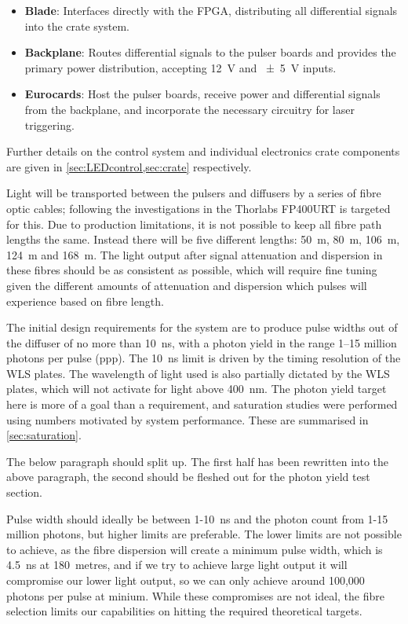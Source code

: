 \documentclass[a4paper,11pt]{article}
\begin{document}
\begin{itemize}
\item \textbf{Blade}: Interfaces directly with the FPGA, distributing all differential signals into the crate system.
\item \textbf{Backplane}: Routes differential signals to the pulser boards and provides the primary power distribution, accepting \SI{12}{\volt} and \SI{\pm5}{\volt} inputs.
\item \textbf{Eurocards}: Host the pulser boards, receive power and differential signals from the backplane, and incorporate the necessary circuitry for laser triggering.
\end{itemize}
Further details on the control system and individual electronics crate components are given in \cref{sec:LEDcontrol,sec:crate} respectively.

Light will be transported between the pulsers and diffusers by a series of fibre optic cables; following the investigations in \cite{TN91} the Thorlabs FP400URT \cite{FP400URT} is targeted for this. Due to production limitations, it is not possible to keep all fibre path lengths the same. Instead there will be five different lengths: 50~m, 80~m, 106~m, 124~m and 168~m. The light output after signal attenuation and dispersion in these fibres should be as consistent as possible, which will require fine tuning given the different amounts of attenuation and dispersion which pulses will experience based on fibre length.

The initial design requirements for the system are to produce pulse widths out of the diffuser of no more than 10~ns, with a photon yield in the range 1--15 million photons per pulse (ppp). The 10~ns limit is driven by the timing resolution of the WLS plates. The wavelength of light used is also partially dictated by the WLS plates, which will not activate for light above 400~nm. The photon yield target here is more of a goal than a requirement, and saturation studies were performed using numbers motivated by system performance. These are summarised in \cref{sec:saturation}.

{\color{red} The below paragraph should split up. The first half has been rewritten into the above paragraph, the second should be fleshed out for the photon yield test section.

Pulse width should ideally be between 1-10~ns and the photon count from 1-15 million photons, but higher limits are preferable. The lower limits are not possible to achieve, as the fibre dispersion will create a minimum pulse width, which is 4.5~ns at 180~metres, and if we try to achieve large light output it will compromise our lower light output, so we can only achieve around 100,000 photons per pulse at minium. While these compromises are not ideal, the fibre selection limits our capabilities on hitting the required theoretical targets.
}
\end{document}
